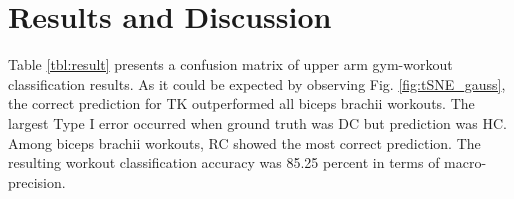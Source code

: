 \documentclass{ISIS}
\def\genbox#1#2#3#4#5#6{%
	\leavevmode\raise#4bp\hbox to#5bp{\vrule height#5bp depth0bp width0bp
		\pdfliteral{q .5 w \csname #2COLOR\endcsname\space RG
			\csname #3PDF\endcsname{#5}{#6} S Q
			\ifx1#1 q \csname #2COLOR\endcsname\space rg 
			\csname #3PDF\endcsname{#5}{#6} f Q\fi}\hss}}
\def\sqbox      #1#2{\genbox{#1}{#2}  {sq}       {0}   {4.5}  {2.25}}
\def\trianbox   #1#2{\genbox{#1}{#2}  {trian}    {0}   {5}    {2.5}}
\def\circbox    #1#2{\genbox{#1}{#2}  {circ}     {0}   {5}    {2.5}}
\def\diabox     #1#2{\genbox{#1}{#2}  {dia}      {-.5} {6}    {3}}
\begin{document}

\newcommand{\mcircle}{{\color{magenta}{$\bullet$}}}
\section{Results and Discussion}
%
Table \ref{tbl:result} presents a confusion matrix of upper arm gym-workout classification results. As it could be expected by observing Fig. \ref{fig:tSNE_gauss}, the correct prediction for TK outperformed all biceps brachii workouts. The largest Type I error occurred when ground truth was DC but prediction was HC. Among biceps brachii workouts, RC showed the most correct prediction. The resulting workout classification accuracy was 85.25 percent in terms of macro-precision.
\end{document}
